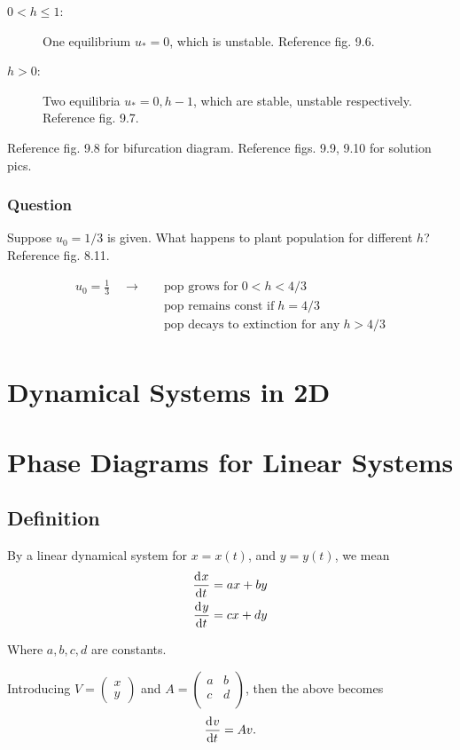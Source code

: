\documentclass[12pt]{article}
\begin{document}
\begin{description}
\item[$0<h\le1$:] One equilibrium $u_*=0$, which is unstable. Reference fig. 9.6.
\item[$h>0$:] Two equilibria $u_*=0, h-1$, which are stable, unstable
  respectively. Reference fig. 9.7.
\end{description}
Reference fig. 9.8 for bifurcation diagram. Reference figs. 9.9, 9.10 for
solution pics.

\subsubsection*{Question}
Suppose $u_0=1/3$ is given. What happens to plant population for different $h$?
Reference fig. 8.11.

\begin{equation}
  \begin{aligned}
    u_0 = \frac{1}{3} \quad\longrightarrow \quad& \text{pop grows for}\; 0<h<4/3 \\
    & \text{pop remains const if}\; h=4/3 \\
    & \text{pop decays to extinction for any}\; h>4/3 \\
  \end{aligned}
\end{equation}

\section{Dynamical Systems in 2D}
\section{Phase Diagrams for Linear Systems}
\subsection{Definition}
By a linear dynamical system for $x=x(t)$, and $y=y(t)$, we mean
\begin{equation}
  \begin{aligned}
    \frac{\mathrm{d}^{} {x}}{\mathrm{d}{t}^{}} &= ax+by \\
    \frac{\mathrm{d}^{} {y}}{\mathrm{d}{t}^{}} &= cx+dy \\
  \end{aligned}
\end{equation}

Where $a,b,c,d$ are constants.

Introducing $V= \begin{pmatrix} x \\ y \end{pmatrix}$ and $A = \begin{pmatrix} a
  & b \\ c & d \\ \end{pmatrix}$, then the above becomes $$\frac{\mathrm{d}^{} {v}}{\mathrm{d}{t}^{}}=Av.$$
\end{document}
